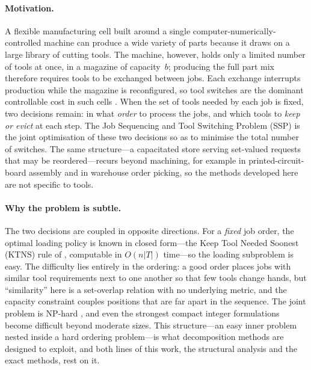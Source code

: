\documentclass[11pt,a4paper]{article}
\theoremstyle{plain}
\theoremstyle{definition}
\theoremstyle{remark}
\begin{document}
\paragraph{Motivation.}
A flexible manufacturing cell built around a single computer-numerically-controlled
machine can produce a wide variety of parts because it draws on a large library of
cutting tools. The machine, however, holds only a limited number of tools at once,
in a magazine of capacity~$b$; producing the full part mix therefore requires tools
to be exchanged between jobs. Each exchange interrupts production while the magazine
is reconfigured, so tool switches are the dominant controllable cost in such cells
\citep{Crama1994}. When the set of tools needed by each job is fixed, two decisions
remain: in what \emph{order} to process the jobs, and which tools to \emph{keep or
evict} at each step. The Job Sequencing and Tool Switching Problem (SSP) is the
joint optimisation of these two decisions so as to minimise the total number of
switches. The same structure---a capacitated store serving set-valued requests that
may be reordered---recurs beyond machining, for example in printed-circuit-board
assembly and in warehouse order picking, so the methods developed here are not
specific to tools.

\paragraph{Why the problem is subtle.}
The two decisions are coupled in opposite directions. For a \emph{fixed} job order,
the optimal loading policy is known in closed form---the Keep Tool Needed Soonest
(KTNS) rule of \citet{Tang1988}, computable in $O(n\lvert T\rvert)$ time---so the
loading subproblem is easy. The difficulty lies entirely in the ordering: a good
order places jobs with similar tool requirements next to one another so that few
tools change hands, but ``similarity'' here is a set-overlap relation with no
underlying metric, and the capacity constraint couples positions that are far apart
in the sequence. The joint problem is NP-hard \citep{Crama1994,Laporte2004}, and
even the strongest compact integer formulations \citep{Catanzaro2015,Laporte2004,%
daSilva2024} become difficult beyond moderate sizes. This structure---an easy inner
problem nested inside a hard ordering problem---is what decomposition methods are
designed to exploit, and both lines of this work, the structural analysis and the
exact methods, rest on it.
\end{document}
